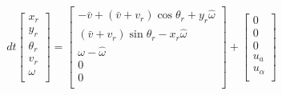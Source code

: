 \documentclass{article}
\begin{document}
\begin{equation}
dt\begin{bmatrix}
x_r \\
y_r \\
\theta_r \\
v_r \\
\omega\\
\end{bmatrix} = 
\begin{bmatrix}
-\bar{v} + (\bar{v} + v_r) \cos\theta_r + y_r \hat{\omega} \\
(\bar{v} + v_r)\sin\theta_r - x_r \hat{\omega}\\
\omega - \hat{\omega}\\
0 \\
0\\
\end{bmatrix} + 
\begin{bmatrix}
0 \\
0\\
0\\
u_a \\
u_\alpha\\
\end{bmatrix}
\label{5d-dyn}
\end{equation}
\end{document}

